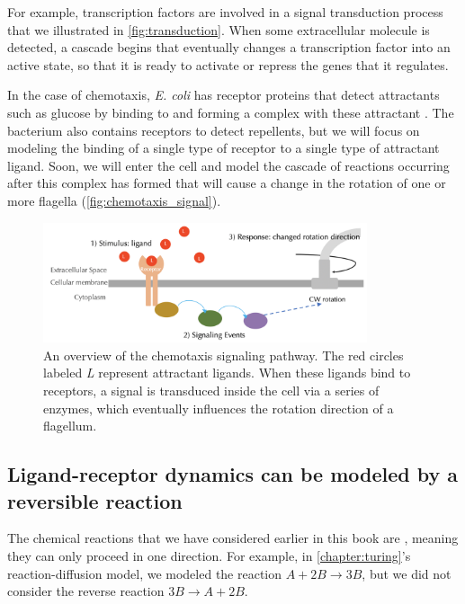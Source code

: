For example, transcription factors are involved in a signal transduction process that we illustrated in \autoref{fig:transduction}. When some extracellular molecule is detected, a cascade begins that eventually changes a transcription factor into an active state, so that it is ready to activate or repress the genes that it regulates.

In the case of chemotaxis, \textit{E. coli} has receptor proteins that detect attractants such as glucose by binding to and forming a complex with these attractant . The bacterium also contains receptors to detect repellents, but we will focus on modeling the binding of a single type of receptor to a single type of attractant ligand. Soon, we will enter the cell and model the cascade of reactions occurring after this complex has formed that will cause a change in the rotation of one or more flagella (\autoref{fig:chemotaxis_signal}).\\

\begin{figure}[h]
\centering
\mySfFamily
\includegraphics[width = 0.85\textwidth]{../images/chemotaxis_signal.png}
\caption{An overview of the chemotaxis signaling pathway. The red circles labeled \textit{L} represent attractant ligands. When these ligands bind to receptors, a signal is transduced inside the cell via a series of enzymes, which eventually influences the rotation direction of a flagellum.}
\label{fig:chemotaxis_signal}
\end{figure}

\FloatBarrier
\nopagebreak
{}
\subsection{Ligand-receptor dynamics can be modeled by a reversible reaction}

The chemical reactions that we have considered earlier in this book are , meaning they can only proceed in one direction. For example, in \autoref{chapter:turing}'s reaction-diffusion model, we modeled the reaction $A + 2B \rightarrow 3B$, but we did not consider the reverse reaction $3B \rightarrow A + 2B$.


